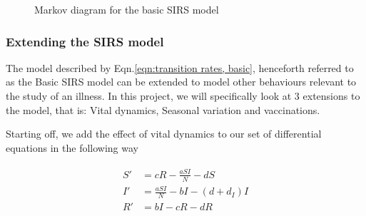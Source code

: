 \documentclass[10pt,showpacs,preprintnumbers,amsmath,amssymb,nofootinbib,aps,prl,twocolumn,groupedaddress,superscriptaddress,showkeys]{revtex4-1}
\begin{document}
    \begin{figure}[h!tbp]
      \centering 
       \caption{Markov diagram for the basic SIRS model\label{fig:SIRS diagram}}
    \end{figure}

    \subsubsection{Extending the SIRS model}
      The model described by Eqn.\ref{eqn:transition rates, basic}, henceforth referred to as the Basic SIRS model can be extended to model other behaviours relevant to the study of an illness. In this project, we will specifically look at 3 extensions to the model, that is: Vital dynamics, Seasonal variation and vaccinations.

      Starting off, we add the effect of vital dynamics to our set of differential equations in the following way

      \begin{align}
        \begin{split}
          S' &= cR - \frac{aSI}{N} - dS\\
          I' &= \frac{aSI}{N} - bI - (d + d_I)I \\
          R' &= bI - cR - dR
        \label{eqn:transition rates, vitdyn}
      \end{split}
    \end{align}
\end{document}
